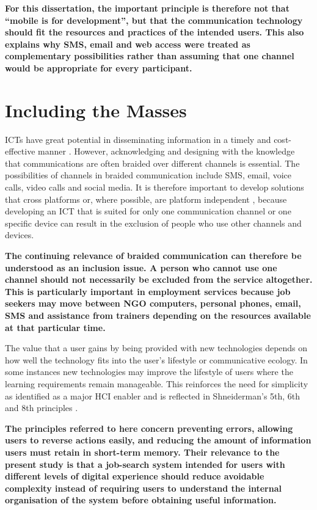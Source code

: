 \textbf{For this dissertation, the important principle is therefore not that “mobile is for development”, but that the communication technology should fit the resources and practices of the intended users. This also explains why SMS, email and web access were treated as complementary possibilities rather than assuming that one channel would be appropriate for every participant.}

\section{Including the Masses}

ICTs have great potential in disseminating information in a timely and cost-effective manner \cite{elijah2006}. However, acknowledging and designing with the knowledge that communications are often braided \cite{densmore2013} over different channels is essential. The possibilities of channels in braided communication include SMS, email, voice calls, video calls and social media. It is therefore important to develop solutions that cross platforms or, where possible, are platform independent \cite{molapo2015}, because developing an ICT that is suited for only one communication channel or one specific device can result in the exclusion of people who use other channels and devices.

\textbf{The continuing relevance of braided communication can therefore be understood as an inclusion issue. A person who cannot use one channel should not necessarily be excluded from the service altogether. This is particularly important in employment services because job seekers may move between NGO computers, personal phones, email, SMS and assistance from trainers depending on the resources available at that particular time.}

The value that a user gains by being provided with new technologies depends on how well the technology fits into the user’s lifestyle or communicative ecology. In some instances new technologies may improve the lifestyle of users where the learning requirements remain manageable. This reinforces the need for simplicity as identified as a major HCI enabler and is reflected in Shneiderman’s 5th, 6th and 8th principles \cite{shneiderman2004}.

\textbf{The principles referred to here concern preventing errors, allowing users to reverse actions easily, and reducing the amount of information users must retain in short-term memory. Their relevance to the present study is that a job-search system intended for users with different levels of digital experience should reduce avoidable complexity instead of requiring users to understand the internal organisation of the system before obtaining useful information.}

